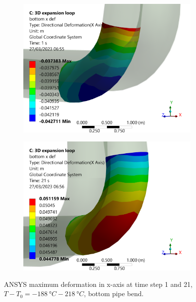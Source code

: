 \begin{figure}[H]
    \centering
    \begin{subfigure}[b]{0.45\textwidth}
        \includegraphics[width=\textwidth]{img/part2b-3.png}
    \end{subfigure}
    \hfill
    \begin{subfigure}[b]{0.45\textwidth}
        \includegraphics[width=\textwidth]{img/part2b-4.png}
    \end{subfigure}
    \caption{ANSYS maximum deformation in x-axis at time step 1 and 21, $T-T_0 = \SI{-188}{\degree C}-\SI{218}{\degree C}$, bottom pipe bend.}
    \label{part2b3}
\end{figure}
